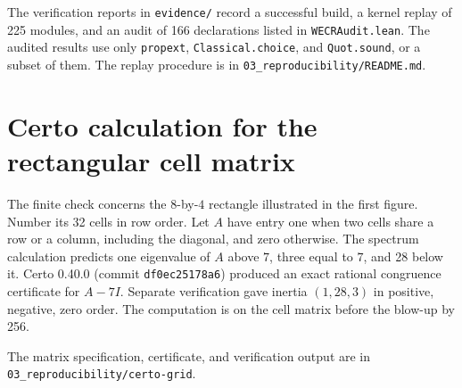 \documentclass[11pt]{article}
\newcommand{\leanref}[1]{\texttt{#1.lean}}
\begin{document}
The verification reports in \nolinkurl{evidence/} record a successful build, a kernel replay of 225 modules, and an audit of 166 declarations listed in \leanref{WECRAudit}. The audited results use only \texttt{propext}, \texttt{Classical.choice}, and \texttt{Quot.sound}, or a subset of them. The replay procedure is in \texttt{03\_reproducibility/README.md}.

\section*{Certo calculation for the rectangular cell matrix}

The finite check concerns the \(8\)-by-\(4\) rectangle illustrated in the first figure. Number its 32 cells in row order. Let \(A\) have entry one when two cells share a row or a column, including the diagonal, and zero otherwise. The spectrum calculation predicts one eigenvalue of \(A\) above \(7\), three equal to \(7\), and 28 below it. Certo 0.40.0 (commit \texttt{df0ec25178a6}) produced an exact rational congruence certificate for \(A-7I\). Separate verification gave inertia \((1,28,3)\) in positive, negative, zero order. The computation is on the cell matrix before the blow-up by 256.

The matrix specification, certificate, and verification output are in \nolinkurl{03_reproducibility/certo-grid}.
\end{document}
